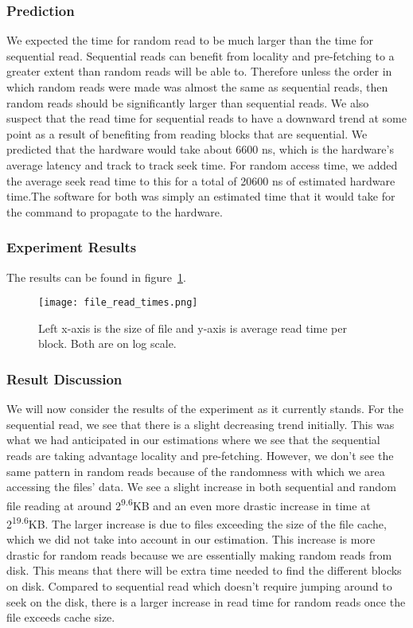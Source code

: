 \documentclass{article} %
\begin{document}
\subsubsection{Prediction}
We expected the time for random read to be much larger than the time for sequential read. Sequential reads can benefit from locality and pre-fetching to a greater extent than random reads will be able to. Therefore unless the order in which random reads were made was almost the same as sequential reads, then random reads should be significantly larger than sequential reads. We also suspect that the read time for sequential reads to have a downward trend at some point as a result of benefiting from reading blocks that are sequential. We predicted that the hardware would take about 6600 ns, which is the hardware's average latency and track to track seek time. For random access time, we added the average seek read time to this for a total of 20600 ns of estimated hardware time.The software for both was simply an estimated time that it would take for the command to propagate to the hardware.

\subsubsection{Experiment Results}

The results can be found in figure~\ref{fig:file_read_times}.

\begin{figure}[!htb]
  \centering
  \texttt{[image: file\_read\_times.png]}
  \caption{Left x-axis is the size of file and y-axis is average read time per block. Both are on log scale.}
  \label{fig:file_read_times}
\end{figure}


\subsubsection{Result Discussion}
We will now consider the results of the experiment as it currently stands. For the sequential read, we see that there is a slight decreasing trend initially. This was what we had anticipated in our estimations where we see that the sequential reads are taking advantage locality and pre-fetching. However, we don't see the same pattern in random reads because of the randomness with which we area accessing the files' data. We see a slight increase in both sequential and random file reading at around 2\textsuperscript{9.6}KB and an even more drastic increase in time at 2\textsuperscript{19.6}KB. The larger increase is due to files exceeding the size of the file cache, which we did not take into account in our estimation. This increase is more drastic for random reads because we are essentially making random reads from disk. This means that there will be extra time needed to find the different blocks on disk. Compared to sequential read which doesn't require jumping around to seek on the disk, there is a larger increase in read time for random reads once the file exceeds cache size.
\end{document}
